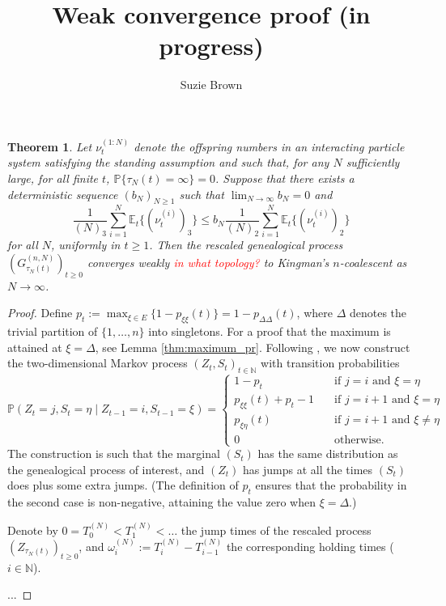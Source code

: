 \documentclass{article}
\title{Weak convergence proof (in progress)}
\author{Suzie Brown}
\newcommand{\seb}[1]{\xspace\textcolor{red}{#1}\xspace}
\newtheorem{theorem}{Theorem}
\newcommand{\Prob}{\mathbb{P}}
\newcommand{\Et}{\mathbb{E}_t}
\newcommand{\1}[1]{\mathbbm{1}_{#1}}
\begin{document}
\maketitle
\thispagestyle{fancy}

\begin{theorem}\label{thm:weakconv}
Let $\nu_t^{(1:N)}$ denote the offspring numbers in an interacting particle system satisfying the standing assumption and such that, for any $N$ sufficiently large, for all finite $t$, $\Prob\{ \tau_N(t) = \infty \} =0$. Suppose that there exists a deterministic sequence $(b_N)_{N\geq1}$ such that ${\lim}_{N\to\infty} b_N =0$ and
\begin{equation}\label{eq:mainthmcond}
\frac{1}{(N)_3} \sum_{i = 1}^N \Et\{ (\nu_t^{(i)})_3 \}  \leq b_N \frac{1}{(N)_2} \sum_{i = 1}^N \Et\{ (\nu_t^{(i)})_2 \}
\end{equation}
for all $N$, uniformly in $t \geq 1$.
Then the rescaled genealogical process $(G_{\tau_N(t)}^{(n,N)})_{t\geq0}$ converges weakly \seb{in what topology?}
to Kingman's $n$-coalescent as $N \to \infty$.
\end{theorem}

\begin{proof}
Define $p_t := \max_{\xi\in E} \{1 - p_{\xi\xi}(t)\} = 1 - p_{\Delta\Delta}(t)$, where $\Delta$ denotes the trivial partition of $\{1,\dots,n\}$ into singletons. For a proof that the maximum is attained at $\xi = \Delta$, see Lemma \ref{thm:maximum_pr}. 
Following \citet{mohle1999}, we now construct the two-dimensional Markov process $(Z_t, S_t)_{t \in \mathbb{N}}$ with transition probabilities
\begin{equation}
\Prob(Z_t = j , S_t = \eta \mid Z_{t-1} = i, S_{t-1} = \xi)
= \begin{cases}
1 - p_t &\quad \text{if } j=i \text{ and } \xi=\eta \\
p_{\xi\xi}(t) + p_t - 1  &\quad \text{if } j=i+1 \text{ and } \xi=\eta \\
p_{\xi\eta}(t) &\quad \text{if } j=i+1 \text{ and } \xi\neq\eta \\
0 &\quad \text{otherwise} .
\end{cases}
\end{equation}
The construction is such that the marginal $(S_t)$ has the same distribution as the genealogical process of interest, and $(Z_t)$ has jumps at all the times $(S_t)$ does plus some extra jumps. (The definition of $p_t$ ensures that the probability in the second case is non-negative, attaining the value zero when $\xi=\Delta$.)

Denote by $0=T_0^{(N)}<T_1^{(N)}<\dots$ the jump times of the rescaled process $(Z_{\tau_N(t)})_{t\geq0}$, and $\omega_i^{(N)} := T_i^{(N)} - T_{i-1}^{(N)}$ the corresponding holding times ($i\in\mathbb{N}$).

...
\end{proof}
\end{document}

